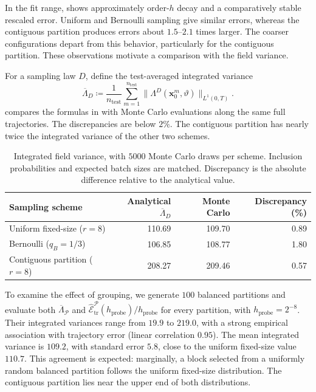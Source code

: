 \documentclass[twoside,11pt]{article}
\theoremstyle{plain}
\newcommand{\bfx}{\mathbf{x}}
\begin{document}
In the fit range,  shows approximately order-$h$ decay and a comparatively stable rescaled error. Uniform and Bernoulli sampling give similar errors, whereas the contiguous partition produces errors about $1.5$--$2.1$ times larger. The coarser configurations depart from this behavior, particularly for the contiguous partition. These observations motivate a comparison with the field variance.

For a sampling law $D$, define the test-averaged integrated variance
\begin{equation}\label{eq:num_integrated_lambda}
\overline\Lambda_D\coloneqq\frac{1}{n_{\mathrm{test}}}
\sum_{m=1}^{n_{\mathrm{test}}}\|\Lambda^D(\bfx_0^m,\vartheta)\|_{L^1(0,T)}.
\end{equation}
 compares the formulas in  with Monte Carlo evaluations along the same full trajectories. The discrepancies are below $2\%$. The contiguous partition has nearly twice the integrated variance of the other two schemes.

\begin{table}[htbp]
\centering
\begin{tabular}{lrrr}
\toprule
Sampling scheme & Analytical $\overline\Lambda_D$ & Monte Carlo & Discrepancy (\%)\\
\midrule
Uniform fixed-size ($r=8$) &110.69&109.70&0.89\\
Bernoulli ($q_B=1/3$) &106.85&108.77&1.80\\
Contiguous partition ($r=8$) &208.27&209.46&0.57\\
\bottomrule
\end{tabular}
\caption{Integrated field variance, with $5000$ Monte Carlo draws per scheme. Inclusion probabilities and expected batch sizes are matched. Discrepancy is the absolute difference relative to the analytical value.}
\label{tab:variance_validation}
\end{table}

To examine the effect of grouping, we generate $100$ balanced partitions and evaluate both $\overline\Lambda_{\mathcal P}$ and $\hat{\mathcal E}^{\mathcal P}_{\mathrm{tr}}(h_{\mathrm{probe}})/h_{\mathrm{probe}}$ for every partition, with $h_{\mathrm{probe}}=2^{-8}$. Their integrated variances range from $19.9$ to $219.0$, with a strong empirical association with trajectory error (linear correlation $0.95$). The mean integrated variance is $109.2$, with standard error $5.8$, close to the uniform fixed-size value $110.7$. This agreement is expected: marginally, a block selected from a uniformly random balanced partition follows the uniform fixed-size distribution. The contiguous partition lies near the upper end of both distributions.
\end{document}
